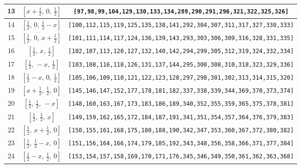 \documentclass[fleqn,8pt]{jsarticle}
\begin{document}
\begin{longtable}{ccc}
13 & $\left[ x + \frac{1}{2},\, 0,\, \frac{1}{2} \right]$ & {\tt [97,98,99,104,129,130,133,134,289,290,291,296,321,322,325,326]} \\ \hline
14 & $\left[ \frac{1}{2},\, 0,\, \frac{1}{2} - x \right]$ & {\tt [100,112,115,119,125,135,138,141,292,304,307,311,317,327,330,333]} \\ \hline
15 & $\left[ \frac{1}{2},\, 0,\, x + \frac{1}{2} \right]$ & {\tt [101,111,114,117,124,136,139,143,293,303,306,309,316,328,331,335]} \\ \hline
16 & $\left[ \frac{1}{2},\, x,\, \frac{1}{2} \right]$ & {\tt [102,107,113,120,127,132,140,142,294,299,305,312,319,324,332,334]} \\ \hline
17 & $\left[ \frac{1}{2},\, - x,\, \frac{1}{2} \right]$ & {\tt [103,108,116,118,126,131,137,144,295,300,308,310,318,323,329,336]} \\ \hline
18 & $\left[ \frac{1}{2} - x,\, 0,\, \frac{1}{2} \right]$ & {\tt [105,106,109,110,121,122,123,128,297,298,301,302,313,314,315,320]} \\ \hline
19 & $\left[ x + \frac{1}{2},\, \frac{1}{2},\, 0 \right]$ & {\tt [145,146,147,152,177,178,181,182,337,338,339,344,369,370,373,374]} \\ \hline
20 & $\left[ \frac{1}{2},\, \frac{1}{2},\, - x \right]$ & {\tt [148,160,163,167,173,183,186,189,340,352,355,359,365,375,378,381]} \\ \hline
21 & $\left[ \frac{1}{2},\, \frac{1}{2},\, x \right]$ & {\tt [149,159,162,165,172,184,187,191,341,351,354,357,364,376,379,383]} \\ \hline
22 & $\left[ \frac{1}{2},\, x + \frac{1}{2},\, 0 \right]$ & {\tt [150,155,161,168,175,180,188,190,342,347,353,360,367,372,380,382]} \\ \hline
23 & $\left[ \frac{1}{2},\, \frac{1}{2} - x,\, 0 \right]$ & {\tt [151,156,164,166,174,179,185,192,343,348,356,358,366,371,377,384]} \\ \hline
24 & $\left[ \frac{1}{2} - x,\, \frac{1}{2},\, 0 \right]$ & {\tt [153,154,157,158,169,170,171,176,345,346,349,350,361,362,363,368]} \\
\end{longtable}
\renewcommand{\arraystretch}{1.2}
\end{document}
